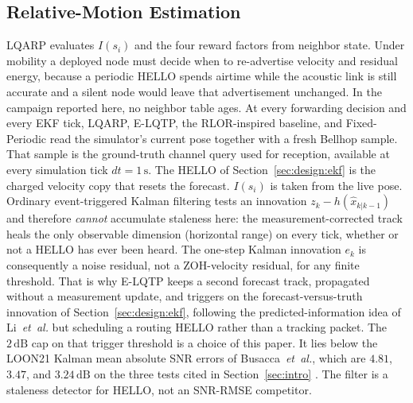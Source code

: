 \subsection{Relative-Motion Estimation}
\label{sec:prelim:est}
LQARP evaluates $I(s_i)$ and the four reward factors from neighbor
state.
Under mobility a deployed node must decide when to re-advertise
velocity and residual energy, because a periodic HELLO spends
airtime while the acoustic link is still accurate and a silent node
would leave that advertisement unchanged.
In the campaign reported here, no neighbor table ages.
At every forwarding decision and every EKF tick, LQARP, E-LQTP, the
RLOR-inspired baseline, and Fixed-Periodic read the simulator's
current pose together with a fresh Bellhop sample.
That sample is the ground-truth channel query used for reception,
available at every simulation tick $dt=1\,\mathrm{s}$.
The HELLO of Section~\ref{sec:design:ekf} is the charged velocity
copy that resets the forecast.
$I(s_i)$ is taken from the live pose.
Ordinary event-triggered Kalman filtering
\cite{priel2023consensus,li2026dse,sebastian2024eco,deng2023auto,zhong2024tsp}
tests an innovation $z_k-h(\hat{x}_{k|k-1})$ and therefore
\emph{cannot} accumulate staleness here: the measurement-corrected
track heals the only observable dimension (horizontal range) on
every tick, whether or not a HELLO has ever been heard.
The one-step Kalman innovation $e_k$ is consequently a noise
residual, not a ZOH-velocity residual, for any finite threshold.
That is why E-LQTP keeps a second forecast track, propagated
without a measurement update, and triggers on the
forecast-versus-truth innovation of
Section~\ref{sec:design:ekf}, following the predicted-information
idea of Li~\emph{et~al.} \cite{li2026dse} but scheduling a routing
HELLO rather than a tracking packet.
The $2\,\mathrm{dB}$ cap on that trigger threshold is a choice of
this paper.
It lies below the LOON21 Kalman mean absolute SNR errors of
Busacca~\emph{et~al.}, which are $4.81$, $3.47$, and
$3.24\,\mathrm{dB}$ on the three tests cited in
Section~\ref{sec:intro} \cite{busacca2024snr}.
The filter is a staleness detector for HELLO, not an SNR-RMSE
competitor.
\FloatBarrier
